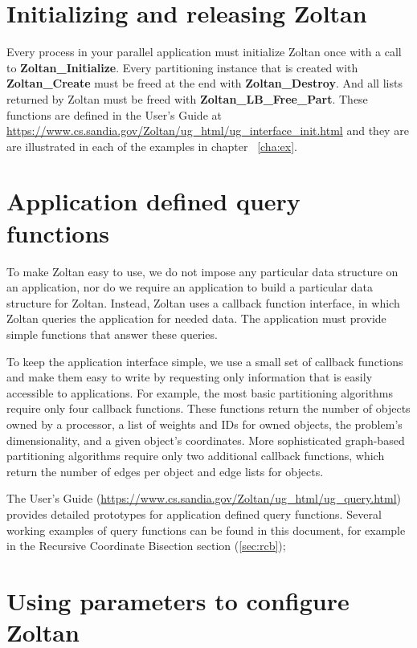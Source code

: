 \section{Initializing and releasing Zoltan}

Every process in your parallel application must initialize Zoltan once
with a call to \textbf{Zoltan\_Initialize}.  Every
partitioning instance that is created with \textbf{Zoltan\_Create} must be freed at
the end with \textbf{Zoltan\_Destroy}.  And all lists returned by
Zoltan must be freed with \textbf{Zoltan\_LB\_Free\_Part}.  These functions
are defined in the User's Guide at
\url{https://www.cs.sandia.gov/Zoltan/ug\_html/ug\_interface\_init.html}
and they are are illustrated in each of the examples in chapter ~\ref{cha:ex}.

\section{Application defined query functions}

To make Zoltan easy to use, we do not impose any particular data structure 
on an application, nor do we require an application to build a particular 
data structure for Zoltan. Instead, Zoltan uses a callback function interface, 
in which Zoltan queries the application for needed data. The application must 
provide simple functions that answer these queries.

To keep the application interface simple, we use a small set of callback functions 
and make them easy to write by requesting only information that is easily accessible 
to applications. For example, the most basic partitioning algorithms require only 
four callback functions. These functions return the number of objects owned by a 
processor, a list of weights and IDs for owned objects, the problem's dimensionality, 
and a given object's coordinates. More sophisticated graph-based partitioning 
algorithms require only two additional callback functions, which return the number 
of edges per object and edge lists for objects.

The User's Guide 
(\url{https://www.cs.sandia.gov/Zoltan/ug\_html/ug\_query.html})
provides detailed prototypes for application defined query functions.
Several working examples of query functions can be found in this document,
for example in the Recursive Coordinate Bisection section (\ref{sec:rcb});

\section{Using parameters to configure Zoltan}

